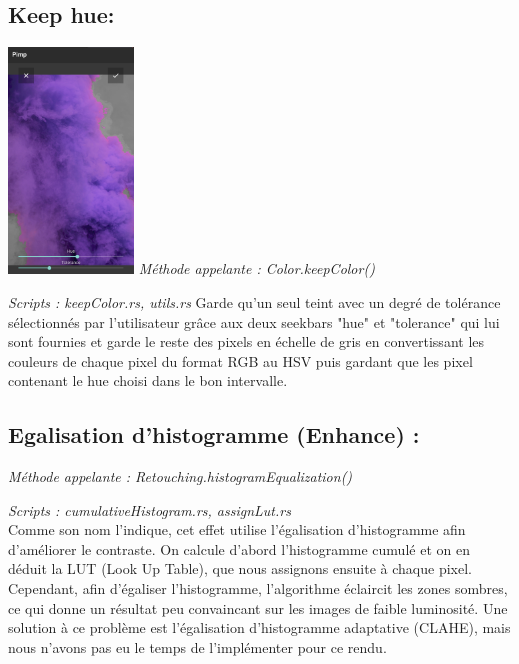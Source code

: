 \subsection{Keep hue:}

\includegraphics[width=0.25\textwidth]{report_src/keepColor.png}
\newline
\emph{Méthode appelante : Color.keepColor()}

\emph{Scripts : keepColor.rs, utils.rs} 
\newline
Garde qu'un seul teint avec un degré de tolérance sélectionnés par l'utilisateur grâce aux deux seekbars "hue"  et "tolerance" qui lui sont fournies et garde 
le reste des pixels en échelle de gris en convertissant les couleurs de chaque pixel du format RGB au HSV puis gardant que les pixel contenant le hue choisi dans le bon intervalle.
\\




\subsection{Egalisation d'histogramme (Enhance) :}

\emph{Méthode appelante : Retouching.histogramEqualization()}

\emph{Scripts : cumulativeHistogram.rs, assignLut.rs} 
\\

Comme son nom l'indique, cet effet utilise l'égalisation d'histogramme afin d'améliorer le contraste.
On calcule d'abord l'histogramme cumulé et on en déduit la LUT (Look Up Table), que nous assignons ensuite à chaque pixel.
\\

Cependant, afin d'égaliser l'histogramme, l'algorithme éclaircit les zones sombres, ce qui donne un résultat peu convaincant sur les images de faible luminosité.
Une solution à ce problème est l'égalisation d'histogramme adaptative (CLAHE), mais nous n'avons pas eu le temps de l'implémenter pour ce rendu.

